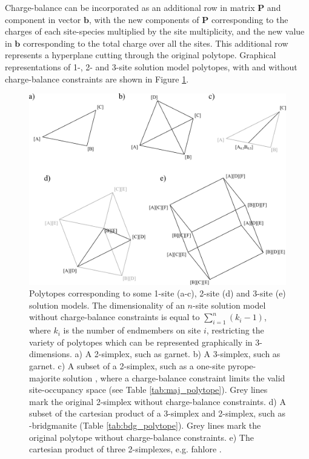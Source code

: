 \documentclass[preprint,12pt]{elsarticle}
\begin{document}
Charge-balance can be incorporated as an additional row in matrix $\boldsymbol{P}$ and component in vector $\boldsymbol{b}$, with the new components of $\boldsymbol{P}$ corresponding to the charges of each site-species multiplied by the site multiplicity, and the new value in $\boldsymbol{b}$ corresponding to the total charge over all the sites. This additional row represents a hyperplane cutting through the original polytope. Graphical representations of 1-, 2- and 3-site solution model polytopes, with and without charge-balance constraints are shown in Figure \ref{fig:solution_polytopes}. 

\begin{figure}[htb!]
  \centering
  \includegraphics[width=\textwidth]{figures/solid_solution_polytopes.pdf}
  \caption{Polytopes corresponding to some 1-site (a-c), 2-site (d) and 3-site (e) solution models. The dimensionality of an $n$-site solution model without charge-balance constraints is equal to $\sum_{i=1}^n (k_i - 1)$, where $k_i$ is the number of endmembers on site $i$, restricting the variety of polytopes which can be represented graphically in 3-dimensions. a) A 2-simplex, such as  garnet. b) A 3-simplex, such as  garnet. c) A subset of a 2-simplex, such as a one-site pyrope-majorite solution , where a charge-balance constraint limits the valid site-occupancy space (see Table \ref{tab:maj_polytope}). Grey lines mark the original 2-simplex without charge-balance constraints. d) A subset of the cartesian product of a 3-simplex and 2-simplex, such as -bridgmanite (Table \ref{tab:bdg_polytope}). Grey lines mark the original polytope without charge-balance constraints. e) The cartesian product of three 2-simplexes, e.g.  fahlore \citep{Sack2017}.}
  \label{fig:solution_polytopes}
\end{figure}
\end{document}
